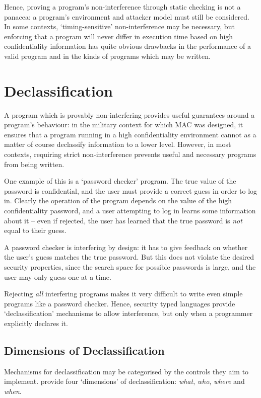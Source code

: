 Hence, proving a program's non-interference through static checking is not a panacea: a program's environment and attacker model must still be considered. In some contexts, `timing-sensitive' non-interference may be necessary, but enforcing that a program will never differ in execution time based on high confidentiality information has quite obvious drawbacks in the performance of a valid program and in the kinds of programs which may be written.

\section{Declassification}

A program which is provably non-interfering provides useful guarantees around a program's behaviour: in the military context for which MAC was designed, it ensures that a program running in a high confidentiality environment cannot as a matter of course declassify information to a lower level. However, in most contexts, requiring strict non-interference prevents useful and necessary programs from being written.

One example of this is a `password checker' program. The true value of the password is confidential, and the user must provide a correct guess in order to log in. Clearly the operation of the program depends on the value of the high confidentiality password, and a user attempting to log in learns some information about it -- even if rejected, the user has learned that the true password is \textit{not} equal to their guess.

A password checker is interfering by design: it has to give feedback on whether the user's guess matches the true password. But this does not violate the desired security properties, since the search space for possible passwords is large, and the user may only guess one at a time.

Rejecting \textit{all} interfering programs makes it very difficult to write even simple programs like a password checker. Hence, security typed languages provide `declassification' mechanisms to allow interference, but only when a programmer explicitly declares it.

\subsection{Dimensions of Declassification}

Mechanisms for declassification may be categorised by the controls they aim to implement. \citeauthor{sabelfeld2005dimensions} \cite{sabelfeld2005dimensions} provide four `dimensions' of declassification: \textit{what}, \textit{who}, \textit{where} and \textit{when}.

